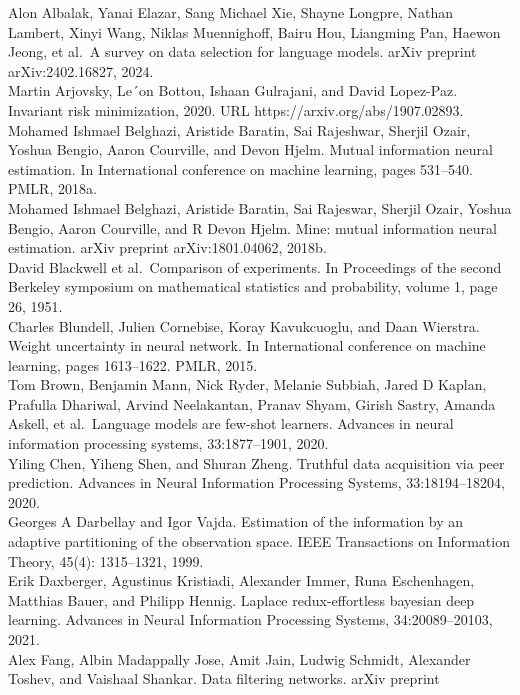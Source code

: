 Alon Albalak, Yanai Elazar, Sang Michael Xie, Shayne Longpre, Nathan
Lambert, Xinyi Wang, Niklas Muennighoff, Bairu Hou, Liangming Pan,
Haewon Jeong, et al.~A survey on data selection for language models.
arXiv preprint arXiv:2402.16827, 2024.\\
Martin Arjovsky, Le´on Bottou, Ishaan Gulrajani, and David Lopez-Paz.
Invariant risk minimization, 2020. URL
https://arxiv.org/abs/1907.02893.\\
Mohamed Ishmael Belghazi, Aristide Baratin, Sai Rajeshwar, Sherjil
Ozair, Yoshua Bengio, Aaron Courville, and Devon Hjelm. Mutual
information neural estimation. In International conference on machine
learning, pages 531--540. PMLR, 2018a.\\
Mohamed Ishmael Belghazi, Aristide Baratin, Sai Rajeswar, Sherjil Ozair,
Yoshua Bengio, Aaron Courville, and R Devon Hjelm. Mine: mutual
information neural estimation. arXiv preprint arXiv:1801.04062, 2018b.\\
David Blackwell et al.~Comparison of experiments. In Proceedings of the
second Berkeley symposium on mathematical statistics and probability,
volume 1, page 26, 1951.\\
Charles Blundell, Julien Cornebise, Koray Kavukcuoglu, and Daan
Wierstra. Weight uncertainty in neural network. In International
conference on machine learning, pages 1613--1622. PMLR, 2015.\\
Tom Brown, Benjamin Mann, Nick Ryder, Melanie Subbiah, Jared D Kaplan,
Prafulla Dhariwal, Arvind Neelakantan, Pranav Shyam, Girish Sastry,
Amanda Askell, et al.~Language models are few-shot learners. Advances in
neural information processing systems, 33:1877--1901, 2020.\\
Yiling Chen, Yiheng Shen, and Shuran Zheng. Truthful data acquisition
via peer prediction. Advances in Neural Information Processing Systems,
33:18194--18204, 2020.\\
Georges A Darbellay and Igor Vajda. Estimation of the information by an
adaptive partitioning of the observation space. IEEE Transactions on
Information Theory, 45(4): 1315--1321, 1999.\\
Erik Daxberger, Agustinus Kristiadi, Alexander Immer, Runa Eschenhagen,
Matthias Bauer, and Philipp Hennig. Laplace redux-effortless bayesian
deep learning. Advances in Neural Information Processing Systems,
34:20089--20103, 2021.\\
Alex Fang, Albin Madappally Jose, Amit Jain, Ludwig Schmidt, Alexander
Toshev, and Vaishaal Shankar. Data filtering networks. arXiv preprint
